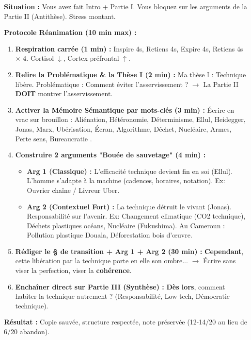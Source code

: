 \documentclass[11pt]{article}
\newcommand{\cle}[1]{{\popxbold\color{popdark}#1}}
\begin{document}
\begin{exoresolu}
\textbf{Situation :} Vous avez fait Intro + Partie I. Vous bloquez sur les arguments de la Partie II (Antithèse). Stress montant.

\tcblower
\textbf{Protocole \og Réanimation \fg (10 min max) :}
\begin{enumerate}
    \item \textbf{Respiration carrée (1 min) :} Inspire 4s, Retiens 4s, Expire 4s, Retiens 4s $\times$ 4. Cortisol $\downarrow$, Cortex préfrontal $\uparrow$.
    \item \textbf{Relire la Problématique \& la Thèse I (2 min) :} \og Ma thèse I : Technique libère. Problématique : Comment éviter l'asservissement ? \fg $\rightarrow$ La Partie II \textbf{DOIT} montrer l'asservissement.
    \item \textbf{Activer la \cle{Mémoire Sémantique} par mots-clés (3 min) :} Écrire en vrac sur brouillon : \og Aliénation, Hétéronomie, Déterminisme, Ellul, Heidegger, Jonas, Marx, Ubérisation, Écran, Algorithme, Déchet, Nucléaire, Armes, Perte sens, Bureaucratie \fg.
    \item \textbf{Construire 2 arguments "Bouée de sauvetage" (4 min) :}
    \begin{itemize}
        \item \textbf{Arg 1 (Classique) :} \og L'efficacité technique devient fin en soi (Ellul). L'homme s'adapte à la machine (cadences, horaires, notation). Ex: Ouvrier chaîne / Livreur Uber. \fg
        \item \textbf{Arg 2 (Contextuel Fort) :} \og La technique détruit le vivant (Jonas). Responsabilité sur l'avenir. Ex: Changement climatique (CO2 technique), Déchets plastiques océans, Nucléaire (Fukushima). Au Cameroun : Pollution plastique Douala, Déforestation bois d'œuvre. \fg
    \end{itemize}
    \item \textbf{Rédiger le § de transition + Arg 1 + Arg 2 (30 min) :} \og \textbf{Cependant}, cette libération par la technique porte en elle son ombre... \fg $\rightarrow$ Écrire sans viser la perfection, viser la \textbf{cohérence}.
    \item \textbf{Enchaîner direct sur Partie III (Synthèse) :} \og \textbf{Dès lors}, comment habiter la technique autrement ? \fg (Responsabilité, Low-tech, Démocratie technique).
\end{enumerate}
\textbf{Résultat :} Copie sauvée, structure respectée, note préservée (12-14/20 au lieu de 6/20 abandon).
\end{exoresolu}
\end{document}
